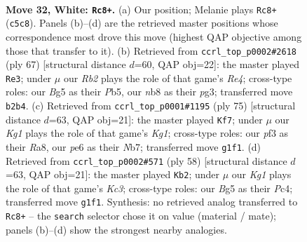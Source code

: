 \documentclass[11pt]{article}
\begin{document}
\clearpage

\begin{figure}[p]\centering
\begin{subfigure}{0.46\textwidth}\centering
\resizebox{\linewidth}{!}{%
\newchessgame
\chessboard[
  setfen={rn4k1/8/4p3/1BR3Bp/4r3/5p1P/bR3P2/6K1 w - - 0 32},
  showmover=false,
  pgfstyle=straightmove, color=movearrow, markmove={c5-c8}
]}
\caption{}
\end{subfigure}\hfill
\begin{subfigure}{0.46\textwidth}\centering
\resizebox{\linewidth}{!}{%
\newchessgame
\chessboard[
  setfen={4k3/2r5/7p/pp1Br1b1/8/P5P1/1KP2R1P/3R4 b - - 0 34},
  showmover=false,
  pgfstyle=straightmove, color=movearrow, markmove={e5-e3}
]}
\caption{}
\end{subfigure}
\\[4pt]
\begin{subfigure}{0.46\textwidth}\centering
\resizebox{\linewidth}{!}{%
\newchessgame
\chessboard[
  setfen={r4bk1/1n1b3p/1P2N3/1p3P2/4R3/1P2B3/4P2P/5K2 b - - 5 38},
  showmover=false,
  pgfstyle=straightmove, color=movearrow, markmove={g8-f7}
]}
\caption{}
\end{subfigure}\hfill
\begin{subfigure}{0.46\textwidth}\centering
\resizebox{\linewidth}{!}{%
\newchessgame
\chessboard[
  setfen={3r1k2/5p1p/4b3/p3R3/2P5/2K5/2R1B1PP/r7 w - - 0 30},
  showmover=false,
  pgfstyle=straightmove, color=movearrow, markmove={c3-b2}
]}
\caption{}
\end{subfigure}
\caption{\textbf{Move 32, White: \texttt{Rc8+}.} (a) Our position; Melanie plays \texttt{Rc8+} (\texttt{c5c8}). Panels (b)--(d) are the retrieved master positions whose correspondence most drove this move (highest QAP objective among those that transfer to it). (b) Retrieved from \texttt{ccrl\_top\_p0002\#2618} (ply 67) [structural distance $d$=60, QAP obj=22]: the master played \texttt{Re3}; under $\mu$ our \emph{Rb2} plays the role of that game's \emph{Re4}; cross-type roles: our \emph{B}g5 as their \emph{P}b5, our \emph{n}b8 as their \emph{p}g3; transferred move \texttt{b2b4}. (c) Retrieved from \texttt{ccrl\_top\_p0001\#1195} (ply 75) [structural distance $d$=63, QAP obj=21]: the master played \texttt{Kf7}; under $\mu$ our \emph{Kg1} plays the role of that game's \emph{Kg1}; cross-type roles: our \emph{p}f3 as their \emph{R}a8, our \emph{p}e6 as their \emph{N}b7; transferred move \texttt{g1f1}. (d) Retrieved from \texttt{ccrl\_top\_p0002\#571} (ply 58) [structural distance $d$=63, QAP obj=21]: the master played \texttt{Kb2}; under $\mu$ our \emph{Kg1} plays the role of that game's \emph{Kc3}; cross-type roles: our \emph{B}g5 as their \emph{P}c4; transferred move \texttt{g1f1}. Synthesis: no retrieved analog transferred to \texttt{Rc8+} -- the \texttt{search} selector chose it on value (material / mate); panels (b)--(d) show the strongest nearby analogies.}
\label{fig:thought-m62}
\end{figure}
\end{document}

